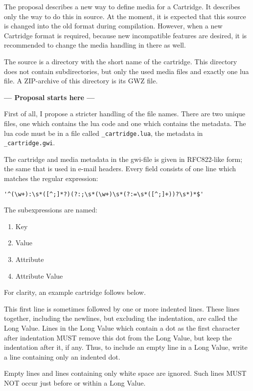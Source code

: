 \documentclass{article}
\begin{document}
The proposal describes a new way to define media for a Cartridge. It describes
only the way to do this in source. At the moment, it is expected that this
source is changed into the old format during compilation. However, when a new
Cartridge format is required, because new incompatible features are desired, it
is recommended to change the media handling in there as well.

The source is a directory with the short name of the cartridge. This directory
does not contain subdirectories, but only the used media files and exactly one
lua file. A ZIP-archive of this directory is its GWZ file.

\noindent\textbf{--- Proposal starts here ---}

First of all, I propose a stricter handling of the file names. There are two
unique files, one which contains the lua code and one which contains the
metadata. The lua code must be in a file called \verb-_cartridge.lua-, the
metadata in \verb-_cartridge.gwi-.

The cartridge and media metadata in the gwi-file is given in RFC822-like form;
the same that is used in e-mail headers. Every field consists of one line which
matches the regular expression:

\begin{center}\verb-'^(\w+):\s*([^;]*?)(?:;\s*(\w+)\s*(?:=\s*([^;]+))?\s*)*$'-\end{center}

The subexpressions are named:
\begin{enumerate}
	\item Key
	\item Value
	\item Attribute
	\item Attribute Value
\end{enumerate}

For clarity, an example cartridge follows below.

This first line is sometimes followed by one or more indented lines. These
lines together, including the newlines, but excluding the indentation, are
called the Long Value. Lines in the Long Value which contain a dot as the first
character after indentation MUST remove this dot from the Long Value, but keep
the indentation after it, if any. Thus, to include an empty line in a Long
Value, write a line containing only an indented dot.

Empty lines and lines containing only white space are ignored. Such lines MUST
NOT occur just before or within a Long Value.
\end{document}
